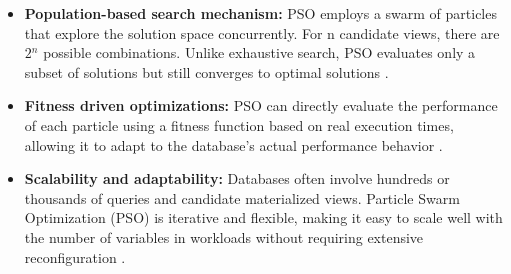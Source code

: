 \begin{itemize}
    \item \textbf{Population-based search mechanism:} PSO employs a swarm of particles that explore the solution space concurrently. For n candidate views, there are $2{^n}$ possible combinations. Unlike exhaustive search, PSO evaluates only a subset of solutions but still converges to optimal solutions \cite{Kennedy_Eberhart}.
    
    \item \textbf{Fitness driven optimizations:} PSO can directly evaluate the performance of each particle using a fitness function based on real execution times, allowing it to adapt to the database's actual performance behavior \cite{Maurice_Clerc-no-date}.
    
    \item \textbf{Scalability and adaptability:} Databases often involve hundreds or thousands of queries and candidate materialized views. Particle Swarm Optimization (PSO) is iterative and flexible, making it easy to scale well with the number of variables in workloads without requiring extensive reconfiguration \cite{van2014swarm}.
\end{itemize}